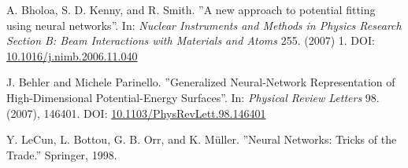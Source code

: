 \documentclass[twoside,english]{uiofysmaster}
\begin{document}
\begin{thebibliography}{56}
 A. Bholoa, S. D. Kenny, and R. Smith.
 ''A new approach to potential fitting using neural networks''.
 In: \textit{Nuclear Instruments and Methods in Physics Research Section B: 
 Beam Interactions with Materials and Atoms} 255. (2007) 1.
 DOI: \href{https://doi.org/10.1016/j.nimb.2006.11.040}{10.1016/j.nimb.2006.11.040}
 
 J. Behler and Michele Parinello. 
 ''Generalized Neural-Network Representation of High-Dimensional Potential-Energy Surfaces''.
 In: \textit{Physical Review Letters} 98. (2007), 146401. 
 DOI: \href{http://dx.doi.org/10.1103/PhysRevLett.98.146401}{10.1103/PhysRevLett.98.146401}
 
 Y. LeCun, L. Bottou, G. B. Orr, and K. Müller.
 ''Neural Networks: Tricks of the Trade.''
 Springer, 1998. 
 
 
 
\end{thebibliography}
\end{document}
